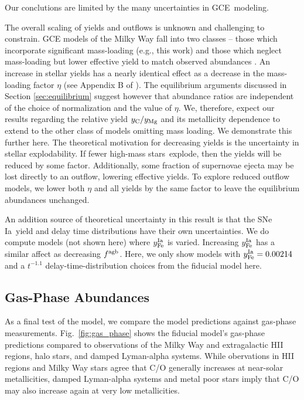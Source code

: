 \documentclass[fleqn,
usenatbib]{mnras}
\newcommand{\gce}{GCE}
\newcommand{\ia}{SNe Ia}
\newcommand{\hms}{high-mass stars}
\begin{document}
Our conclutions are limited by the many uncertainties in \gce\ modeling. 

The overall scaling of yields and outflows is unknown and challenging to constrain.
\gce{} models of the Milky Way fall into two classes -- those which incorporate significant mass-loading (e.g., this work) and those which neglect mass-loading but lower effective yield to match observed abundances \citep[e.g.][]{MCM13, MCM14, spitoni19, spitoni20, spitoni21}.
An increase in stellar yields has a nearly identical effect as a decrease in the mass-loading factor $\eta$ (see Appendix B of \citealt{james_dwarf}).
The equilibrium arguments discussed in Section \ref{sec:equilibrium} suggest however that abundance ratios are independent of the choice of normalization and the value of $\eta$. We, therefore, expect our results regarding the relative yield $y_{\rm C}/y_{\rm Mg}$ and its metallicity dependence to extend to the other class of models omitting mass loading. We demonstrate this further here.
The theoretical motivation for decreasing yields is the uncertainty in stellar explodability.
If fewer \hms\ explode, then the yields will be reduced by some factor. Additionally, some fraction of supernovae ejecta may be lost directly to an outflow, lowering effective yields. To explore reduced outflow models, we lower both $\eta$ and all yields by the same factor to leave the equilibrium abundances unchanged. 


An addition source of theoretical uncertainty in this result is that the \ia\ yield and delay time distributions have their own uncertainties. We do compute models (not shown here) where $y_{\rm Fe}^{\rm Ia}$ is varied. Increasing $y_{\rm Fe}^{\rm Ia}$ has a similar affect as decreasing $f^{\rm agb}$. Here, we only show models with $y_{\rm Fe}^{\rm Ia} = 0.00214$ and a $t^{-1.1}$ delay-time-distribution choices from the fiducial model here.



\subsection{Gas-Phase Abundances}\label{sec:gas}

As a final test of the model, we compare the model predictions against gas-phase measurements. Fig.~\ref{fig:gas_phase} shows the fiducial model's gas-phase predictions compared to observations of the Milky Way and extragalactic HII regions, halo stars, and damped Lyman-alpha systems. 
While obervations in HII regions and Milky Way stars agree that C/O generally increases at near-solar metallicities, damped Lyman-alpha systems and metal poor stars imply that C/O may also increase again at very low metallicities. 
\end{document}
